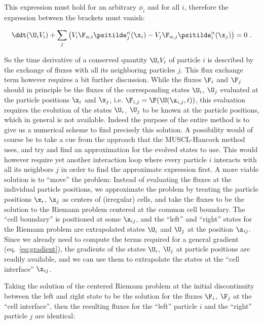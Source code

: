 This expression must hold for an arbitrary $\phi_i$ and for all $i$, therefore the expression
between the brackets must vanish:

\begin{align}
    \ddt (\U_i V_i) + \sum_j
        \left( V_i \F_{\alpha, i} \psitilde_j^\alpha (\x_i)
        - V_j \F_{\alpha, j} \psitilde_i^\alpha (\x_j) \right)
    = 0 \ .
\end{align}

So the time derivative of a conserved quantity $\U_i V_i$ of particle $i$ is described by the
exchange of fluxes with all its neighboring particles $j$. This flux exchange term however requires
a bit further discussion. While the fluxes $\F_i$ and $\F_j$ should in principle be the fluxes of
the corresponding states $\U_i$, $\U_j$ evaluated at the particle positions $\x_i$ and $\x_j$, i.e.
$\F_{i,j} = \F(\U(\x_{i,j}, t))$, this evaluation requires the evolution of the states $\U_{i}$,
$\U_j$ to be known at the particle positions, which in general is not available. Indeed the purpose
of the entire method is to give us a numerical scheme to find precisely this solution. A possibility
would of course be to take a cue from the approach that the MUSCL-Hancock method uses, and try and
find an approximation for the evolved states to use. This would however require yet another
interaction loop where every particle $i$ interacts with all its neighbors $j$ in order to find the
approximate expression first. A more viable solution is to ``move'' the problem: Instead of
evaluating the fluxes at the individual particle positions, we approximate the problem by treating
the particle positions $\x_{i}$, $\x_j$ as centers of (irregular) cells, and take the fluxes to be
the solution to the Riemann problem centered at the common cell boundary. The ``cell boundary'' is
positioned at some $\x_{ij}$, and the ``left'' and ``right'' states for the Riemann problem are
extrapolated states $\U_i$ and $\U_j$ at the position $\x_{ij}$. Since we already need to compute
the terms required for a general gradient (eq.~\ref{eq:gradient}),  the gradients of the states
$\U_{i}$, $\U_j$ at particle positions are readily available, and we can use them to extrapolate
the states at the ``cell interface'' $\x_{ij}$.

Taking the solution of the centered Riemann problem at the initial discontinuity between the left
and right state to be the solution for the fluxes $\F_{i}$, $\F_j$ at the ``cell interface'', then
the resulting fluxes for the ``left'' particle $i$ and the ``right'' particle $j$ are identical:


